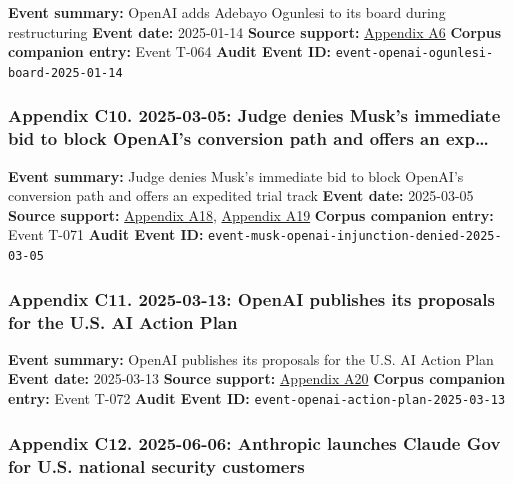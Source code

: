 \documentclass[
  american,
  11pt,
  letterpaper,
]{article}
\begin{document}
\textbf{Event summary:} OpenAI adds Adebayo Ogunlesi to its board during
restructuring \textbf{Event date:} 2025-01-14 \textbf{Source support:}
\hyperref[ch-08-appendix-a6-openai-appoints-one-of-wall-street-s-most-powerful-dealmakers-to-its-board]{Appendix
A6} \textbf{Corpus companion entry:} Event T-064 \textbf{Audit Event
ID:} \texttt{event-openai-ogunlesi-board-2025-01-14}

\subsubsection{Appendix C10. 2025-03-05: Judge denies Musk's immediate
bid to block OpenAI's conversion path and offers an
exp\ldots{}}\label{ch-08-appendix-c10-2025-03-05-judge-denies-musk-s-immediate-bid-to-block-openai-s-conversion-path-and-offers-an-expedited-trial-track}

\textbf{Event summary:} Judge denies Musk's immediate bid to block
OpenAI's conversion path and offers an expedited trial track
\textbf{Event date:} 2025-03-05 \textbf{Source support:}
\hyperref[ch-08-appendix-a18-judge-denies-elon-musk-s-request-to-block-openai-for-profit-conversion-but-welcomes-trial]{Appendix
A18},
\hyperref[ch-08-appendix-a19-judge-denies-elon-musks-attempt-to-immediately-block-openais-conversion-to-for-profit-entity]{Appendix
A19} \textbf{Corpus companion entry:} Event T-071 \textbf{Audit Event
ID:} \texttt{event-musk-openai-injunction-denied-2025-03-05}

\subsubsection{Appendix C11. 2025-03-13: OpenAI publishes its proposals
for the U.S. AI Action
Plan}\label{ch-08-appendix-c11-2025-03-13-openai-publishes-its-proposals-for-the-u-s-ai-action-plan}

\textbf{Event summary:} OpenAI publishes its proposals for the U.S. AI
Action Plan \textbf{Event date:} 2025-03-13 \textbf{Source support:}
\hyperref[ch-08-appendix-a20-openais-proposals-for-the-us-ai-action-plan]{Appendix
A20} \textbf{Corpus companion entry:} Event T-072 \textbf{Audit Event
ID:} \texttt{event-openai-action-plan-2025-03-13}

\subsubsection{Appendix C12. 2025-06-06: Anthropic launches Claude Gov
for U.S. national security
customers}\label{ch-08-appendix-c12-2025-06-06-anthropic-launches-claude-gov-for-u-s-national-security-customers}
\end{document}
